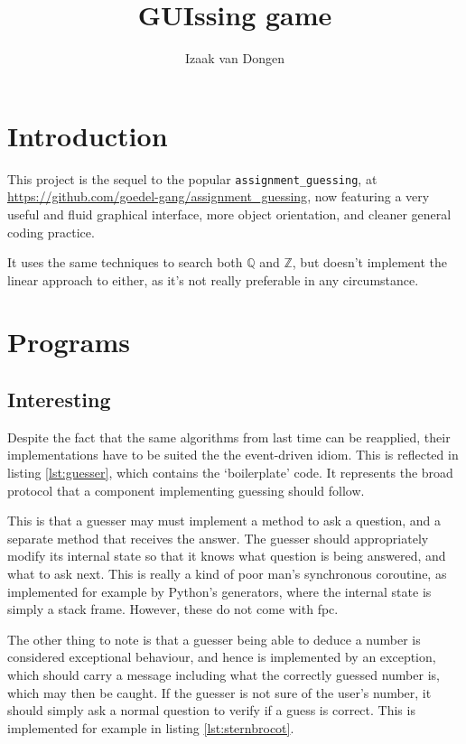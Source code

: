 \documentclass[a4paper,11pt]{article}
\title{GUIssing game}
\author{Izaak van Dongen}
\begin{document}
    \maketitle\thispagestyle{empty} %
    \tableofcontents
    \listoflistings

    \section{Introduction}

    This project is the sequel to the popular \texttt{assignment\_guessing},
    at \url{https://github.com/goedel-gang/assignment_guessing}, now featuring
    a very useful and fluid graphical interface, more object orientation, and
    cleaner general coding practice.

    It uses the same techniques to search both $\mathbb{Q}$ and $\mathbb{Z}$,
    but doesn't implement the linear approach to either, as it's not really
    preferable in any circumstance.

    \section{Programs}

    \subsection{Interesting}

    Despite the fact that the same algorithms from last time can be reapplied,
    their implementations have to be suited the the event-driven idiom. This is
    reflected in listing \ref{lst:guesser}, which contains the `boilerplate'
    code. It represents the broad protocol that a component implementing
    guessing should follow.

    This is that a guesser may must implement a method to ask a question, and a
    separate method that receives the answer. The guesser should appropriately
    modify its internal state so that it knows what question is being answered,
    and what to ask next. This is really a kind of poor man's synchronous
    coroutine, as implemented for example by Python's generators, where the
    internal state is simply a stack frame. However, these do not come with fpc.

    The other thing to note is that a guesser being able to deduce a number is
    considered exceptional behaviour, and hence is implemented by an exception,
    which should carry a message including what the correctly guessed number is,
    which may then be caught. If the guesser is not sure of the user's number,
    it should simply ask a normal question to verify if a guess is correct. This
    is implemented for example in listing \ref{lst:sternbrocot}.
\end{document}
